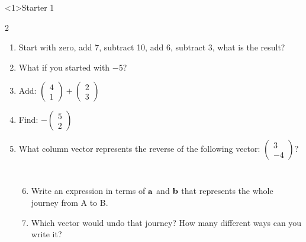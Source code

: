\documentclass{beamer}
\newcommand{\ashow}[1]{\uncover<2->{\textcolor{red}{\small #1}}}
\begin{document}
\begin{frame}<1>{Starter 1}

\begin{multicols}{2}
\begin{enumerate}
  \item Start with zero, add 7, subtract 10, add 6, subtract 3, what is the result? \ashow{0}
  \item What if you started with $-5$? \ashow{$-5$}
  \item Add:
  $\begin{pmatrix}4\\1\end{pmatrix}
  +
  \begin{pmatrix}2\\3\end{pmatrix}$ \ashow{\(\binom{6}{4}\)}
  \item Find:
  $-\begin{pmatrix}5\\2\end{pmatrix}$ \ashow{\(\binom{-5}{-2}\)}
  \item What column vector represents the reverse of the following vector:
  $\begin{pmatrix}3\\-4\end{pmatrix}$? \ashow{\(\binom{-3}{4}\)}
\end{enumerate}
\end{multicols}

\vspace{0.3cm}



\begin{columns}[T]

\begin{center}
\end{center}


\begin{enumerate}
    \setcounter{enumi}{5}
  \item Write an expression in terms of $\bf{a}$ and $\bf{b}$ that represents the whole journey from A to B. \ashow{\(\mathbf{a}+\mathbf{b}\)}
  \item Which vector would undo that journey? How many different ways can you write it? \ashow{\(\overrightarrow{BA} = -(\mathbf{a}+\mathbf{b}) = -\mathbf{a}-\mathbf{b}\)}
\end{enumerate}

\end{columns}

\end{frame}

\end{document}
